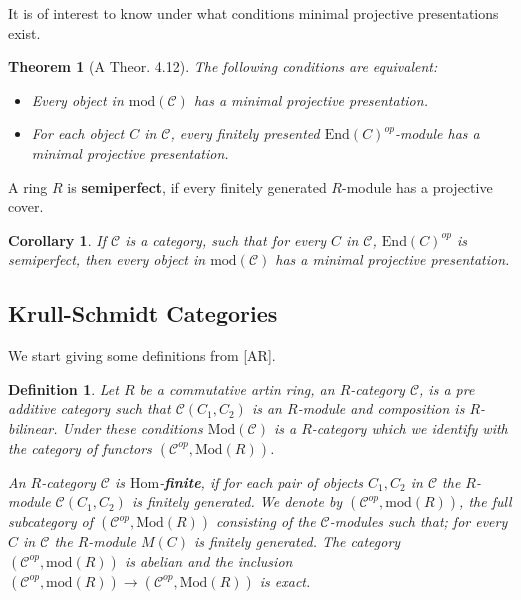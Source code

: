 \documentclass{amsart}
\newtheorem{theorem}{Theorem}
\theoremstyle{plain}
\newtheorem{corollary}{Corollary}
\newtheorem{definition}{Definition}
\numberwithin{equation}{section}
\begin{document}
It is of interest to know under what conditions minimal projective
presentations exist.

\begin{theorem}[A Theor. 4.12]
\label{cap1.13} The following conditions are equivalent:

\begin{itemize}
\item[(a)] Every object in $\mathrm{mod}(\mathcal{C})$ has a minimal
projective presentation.

\item[(b)] For each object $C$ in $\mathcal{C}$, every finitely presented $\mathrm{End}(C)^{op}$-module has a minimal projective presentation.
\end{itemize}
\end{theorem}

A ring $R$ is \textbf{semiperfect}, if every finitely generated $R$-module
has a projective cover.

\begin{corollary}
\label{cap1.14} If $\mathcal{C}$ is a category, such that for every $C$ in $\mathcal{C}$, $\mathrm{End}(C)^{op}$ is semiperfect, then every object in $\mathrm{mod}(\mathcal{C})$ has a minimal projective presentation.
\end{corollary}

\subsection{ Krull-Schmidt Categories}

We start giving some definitions from [AR].

\begin{definition}
Let $R$ be a commutative artin ring, an $R$-category $\mathcal{C}$, is a pre
additive category such that $\mathcal{C}(C_{1},C_{2})$ is an $R$-module and
composition is $R$-bilinear. Under these conditions $\mathrm{\mathrm{Mod}}(\mathcal{C})$ is a $R$-category which we identify with the category of
functors $(\mathcal{C}^{op},\mathrm{Mod}(R))$.

An $R$-category $\mathcal{C}$ is $\mathrm{Hom}$-\textbf{finite}, if for each
pair of objects $C_{1},C_{2}$ in $\mathcal{C}$ the $R$-module $\mathcal{C}(C_{1},C_{2})$ is finitely generated. We denote by $(\mathcal{C}^{op},\mathrm{mod}(R))$, the full subcategory of $(\mathcal{C}^{op},\mathrm{\mathrm{Mod}}(R))$ consisting of the $\mathcal{C}$-modules such that; for
every $C$ in $\mathcal{C}$ the $R$-module $M(C)$ is finitely generated. The
category $(\mathcal{C}^{op},\mathrm{mod}(R))$ is abelian and the inclusion $(\mathcal{C}^{op},\mathrm{mod}(R))\rightarrow (\mathcal{C}^{op},\mathrm{\mathrm{Mod}}(R)) $ is exact.
\end{definition}
\end{document}

